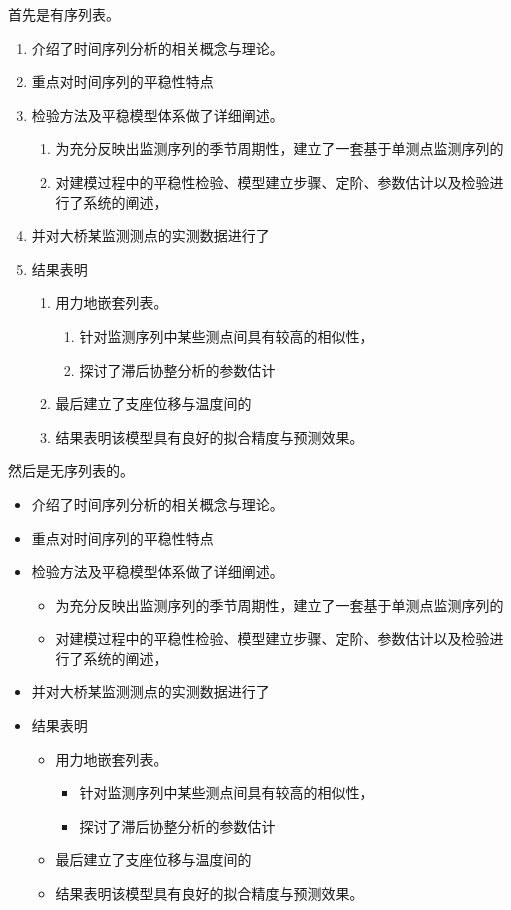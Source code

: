 \documentclass[../Main/thesis]{subfiles}
\begin{document}
首先是有序列表。
\begin{enumerate}
  \item 介绍了时间序列分析的相关概念与理论。
  \item 重点对时间序列的平稳性特点
  \item 检验方法及平稳模型体系做了详细阐述。
  \begin{enumerate}
    \item 为充分反映出监测序列的季节周期性，建立了一套基于单测点监测序列的
    \item 对建模过程中的平稳性检验、模型建立步骤、定阶、参数估计以及检验进行了系统的阐述，
  \end{enumerate}
  \item 并对大桥某监测测点的实测数据进行了
  \item 结果表明
  \begin{enumerate}
    \item 用力地嵌套列表。
    \begin{enumerate}
      \item 针对监测序列中某些测点间具有较高的相似性，
      \item 探讨了滞后协整分析的参数估计
    \end{enumerate}
    \item 最后建立了支座位移与温度间的
    \item 结果表明该模型具有良好的拟合精度与预测效果。
  \end{enumerate}
\end{enumerate}

然后是无序列表的。
\begin{itemize}
  \item 介绍了时间序列分析的相关概念与理论。
  \item 重点对时间序列的平稳性特点
  \item 检验方法及平稳模型体系做了详细阐述。
  \begin{itemize}
    \item 为充分反映出监测序列的季节周期性，建立了一套基于单测点监测序列的
    \item 对建模过程中的平稳性检验、模型建立步骤、定阶、参数估计以及检验进行了系统的阐述，
  \end{itemize}
  \item 并对大桥某监测测点的实测数据进行了
  \item 结果表明
  \begin{itemize}
    \item 用力地嵌套列表。
    \begin{itemize}
      \item 针对监测序列中某些测点间具有较高的相似性，
      \item 探讨了滞后协整分析的参数估计
    \end{itemize}
    \item 最后建立了支座位移与温度间的
    \item 结果表明该模型具有良好的拟合精度与预测效果。
  \end{itemize}
\end{itemize}
\end{document}
